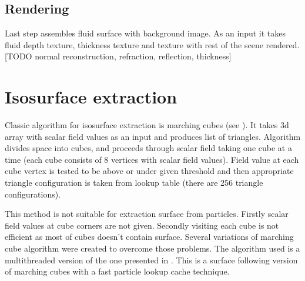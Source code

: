 \subsection{Rendering} \label{sec:rendering}
Last step assembles fluid surface with background image. As an input it takes fluid depth texture, thickness texture and texture with rest of the scene rendered. 
[TODO normal reconstruction, refraction, reflection, thickness]

\section{Isosurface extraction} \label{sec:isosurfaceextraction}
Classic algorithm for isosurface extraction is marching cubes (see \cite{LorensenCline1987}). It takes 3d array with scalar field values as an input and produces list of triangles. Algorithm divides space into cubes, and proceeds through scalar field taking one cube at a time (each cube consists of 8 vertices with scalar field values). Field value at each cube vertex is tested to be above or under given threshold and then appropriate triangle configuration is taken from lookup table (there are 256 triangle configurations).

This method is not suitable for extraction surface from particles. Firstly scalar field values at cube corners are not given. Secondly visiting each cube is not efficient as most of cubes doesn't contain surface. Several variations of marching cube algorithm were created to overcome those problems. The algorithm used is a multithreaded version of the one presented in \cite{RosenbergBirdwell2008}. This is a surface following version of marching cubes with a fast particle lookup cache technique. 

